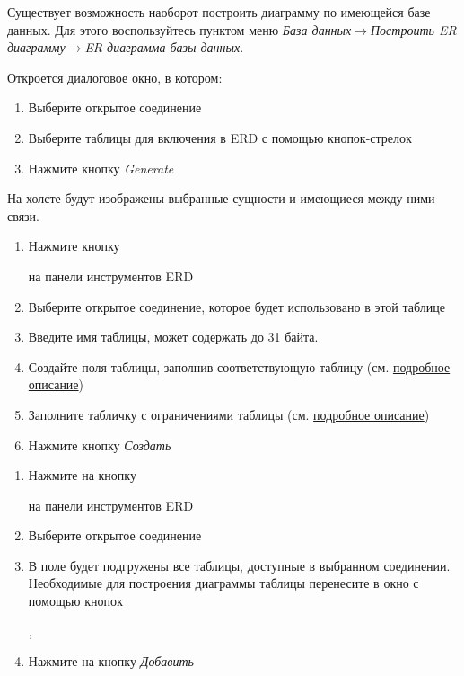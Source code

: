 Существует возможность наоборот построить диаграмму по имеющейся базе данных. Для этого воспользуйтесь пунктом меню \textit{База данных}$\rightarrow$\textit{Построить ER диаграмму}$\rightarrow$\textit{ER-диаграмма базы данных}.

Откроется диалоговое окно, в котором:
\begin{enumerate}
	\item Выберите открытое соединение
	\item Выберите таблицы для включения в ERD с помощью кнопок-стрелок
	\item Нажмите кнопку \textit{Generate}
\end{enumerate}
На холсте будут изображены выбранные сущности и имеющиеся между ними связи.

\label{sec:84}
\begin{enumerate}
	\item Нажмите кнопку  на панели инструментов ERD
	\item Выберите открытое соединение, которое будет использовано в этой таблице
	\item Введите имя таблицы, может содержать до 31 байта.
	\item Создайте поля таблицы, заполнив соответствующую таблицу (см. \hyperref[tab:2]{подробное описание})
	\item Заполните табличку с ограничениями таблицы (см. \hyperref[tab:3]{подробное описание})
	\item Нажмите кнопку \textit{Создать}
\end{enumerate}

\begin{enumerate}
	\item Нажмите на кнопку  на панели инструментов ERD
	\item Выберите открытое соединение
	\item В поле  будет подгружены все таблицы, доступные в выбранном соединении. Необходимые для построения диаграммы таблицы перенесите в окно  с помощью кнопок ,
	\item Нажмите на кнопку \textit{Добавить}
\end{enumerate}

